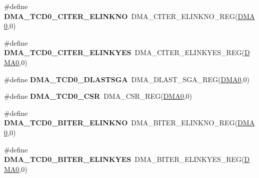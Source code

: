\begin{DoxyCompactItemize}
\item 
\#define {\bfseries D\+M\+A\+\_\+\+T\+C\+D0\+\_\+\+C\+I\+T\+E\+R\+\_\+\+E\+L\+I\+N\+K\+NO}~D\+M\+A\+\_\+\+C\+I\+T\+E\+R\+\_\+\+E\+L\+I\+N\+K\+N\+O\+\_\+\+R\+EG(\hyperlink{group__DMA__Peripheral__Access__Layer_ga4103044f9ca209772f513dc694513ffb}{D\+M\+A0},0)\hypertarget{group__DMA__Register__Accessor__Macros_gaf189723f0b4d98fffdf6860fcb74177d}{}\label{group__DMA__Register__Accessor__Macros_gaf189723f0b4d98fffdf6860fcb74177d}

\item 
\#define {\bfseries D\+M\+A\+\_\+\+T\+C\+D0\+\_\+\+C\+I\+T\+E\+R\+\_\+\+E\+L\+I\+N\+K\+Y\+ES}~D\+M\+A\+\_\+\+C\+I\+T\+E\+R\+\_\+\+E\+L\+I\+N\+K\+Y\+E\+S\+\_\+\+R\+EG(\hyperlink{group__DMA__Peripheral__Access__Layer_ga4103044f9ca209772f513dc694513ffb}{D\+M\+A0},0)\hypertarget{group__DMA__Register__Accessor__Macros_ga9402d88f1a2681a38ed38bfdb2a94969}{}\label{group__DMA__Register__Accessor__Macros_ga9402d88f1a2681a38ed38bfdb2a94969}

\item 
\#define {\bfseries D\+M\+A\+\_\+\+T\+C\+D0\+\_\+\+D\+L\+A\+S\+T\+S\+GA}~D\+M\+A\+\_\+\+D\+L\+A\+S\+T\+\_\+\+S\+G\+A\+\_\+\+R\+EG(\hyperlink{group__DMA__Peripheral__Access__Layer_ga4103044f9ca209772f513dc694513ffb}{D\+M\+A0},0)\hypertarget{group__DMA__Register__Accessor__Macros_gaca4ffe01080735f9e83554fde2f73148}{}\label{group__DMA__Register__Accessor__Macros_gaca4ffe01080735f9e83554fde2f73148}

\item 
\#define {\bfseries D\+M\+A\+\_\+\+T\+C\+D0\+\_\+\+C\+SR}~D\+M\+A\+\_\+\+C\+S\+R\+\_\+\+R\+EG(\hyperlink{group__DMA__Peripheral__Access__Layer_ga4103044f9ca209772f513dc694513ffb}{D\+M\+A0},0)\hypertarget{group__DMA__Register__Accessor__Macros_gac6c6031712fe92a2e0866b5cdaedbc09}{}\label{group__DMA__Register__Accessor__Macros_gac6c6031712fe92a2e0866b5cdaedbc09}

\item 
\#define {\bfseries D\+M\+A\+\_\+\+T\+C\+D0\+\_\+\+B\+I\+T\+E\+R\+\_\+\+E\+L\+I\+N\+K\+NO}~D\+M\+A\+\_\+\+B\+I\+T\+E\+R\+\_\+\+E\+L\+I\+N\+K\+N\+O\+\_\+\+R\+EG(\hyperlink{group__DMA__Peripheral__Access__Layer_ga4103044f9ca209772f513dc694513ffb}{D\+M\+A0},0)\hypertarget{group__DMA__Register__Accessor__Macros_ga96730875a7b5ef4cc612fca19996a011}{}\label{group__DMA__Register__Accessor__Macros_ga96730875a7b5ef4cc612fca19996a011}

\item 
\#define {\bfseries D\+M\+A\+\_\+\+T\+C\+D0\+\_\+\+B\+I\+T\+E\+R\+\_\+\+E\+L\+I\+N\+K\+Y\+ES}~D\+M\+A\+\_\+\+B\+I\+T\+E\+R\+\_\+\+E\+L\+I\+N\+K\+Y\+E\+S\+\_\+\+R\+EG(\hyperlink{group__DMA__Peripheral__Access__Layer_ga4103044f9ca209772f513dc694513ffb}{D\+M\+A0},0)\hypertarget{group__DMA__Register__Accessor__Macros_ga2521a084ea42e98eeceb804e5f7ecb76}{}\label{group__DMA__Register__Accessor__Macros_ga2521a084ea42e98eeceb804e5f7ecb76}


\end{DoxyCompactItemize}
